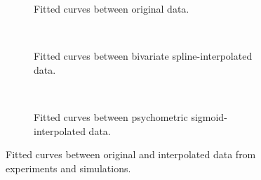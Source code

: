 \begin{multicols}{2}
\begin{figure}[H]
     \centering
    \begin{subfigure}[t]{0.41\textwidth}
        \centering
        
        \caption{Fitted curves between original data.}
        \label{fig:relationship-fit-original}
    \end{subfigure}
    \\ \vspace{\baselineskip}
    \begin{subfigure}[t]{0.41\textwidth}
        \centering
        
        \caption{Fitted curves between bivariate spline-interpolated data.}
        \label{fig:relationship-fit-spline}
    \end{subfigure}
    \\ \vspace{\baselineskip}
    \begin{subfigure}[t]{0.41\textwidth}
        \centering
        
        \caption{Fitted curves between psychometric sigmoid-interpolated data.}
        \label{fig:relationship-fit-sigmoid}
    \end{subfigure}
    \caption[Simulations-experiments relationships with fitted curves]{Fitted curves between original and interpolated data from experiments and simulations.}
    \label{fig:all-fit-relationships}
\end{figure}

\end{multicols}